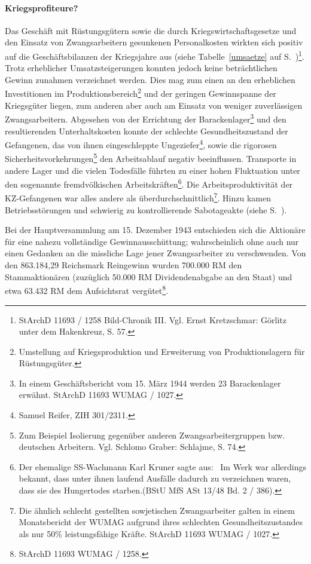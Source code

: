 \documentclass[a4paper,12pt,ngerman,
]{nisebook}
\begin{document}
\paragraph{Kriegsprofiteure?}
Das Geschäft mit Rüstungsgütern sowie die durch Kriegswirtschaftsgesetze und den Einsatz von Zwangsarbeitern gesunkenen Personalkosten wirkten sich positiv auf die Geschäftsbilanzen der Kriegsjahre aus (siehe Tabelle~\ref{umsaetze} auf S.~\pageref{umsaetze})\footnote{StArchD 11693 / 1258 Bild-Chronik III. Vgl. Ernst Kretzschmar: Görlitz unter dem Hakenkreuz, S. 57.}. Trotz erheblicher Umsatzsteigerungen konnten jedoch keine beträchtlichen Gewinn zunahmen verzeichnet werden. Dies mag zum einen an den erheblichen Investitionen im Produktionsbereich\footnote{Umstellung auf Kriegsproduktion und Erweiterung von Produktionslagern für Rüstungsgüter.} und der geringen Gewinnspanne der Kriegsgüter liegen, zum anderen aber auch am Einsatz von weniger zuverlässigen Zwangsarbeitern. Abgesehen von der Errichtung der Barackenlager\footnote{In einem Geschäftsbericht vom 15. März 1944 werden 23 Barackenlager erwähnt. StArchD 11693 WUMAG / 1027.} und den resultierenden Unterhaltskosten konnte der schlechte Gesundheitszustand der Gefangenen, das von ihnen eingeschleppte Ungeziefer\footnote{Samuel Reifer, ZIH 301/2311.}, sowie die rigorosen Sicherheitsvorkehrungen\footnote{Zum Beispiel Isolierung gegenüber anderen Zwangsarbeitergruppen bzw. deutschen Arbeitern. Vgl. Schlomo Graber: Schlajme, S. 74.} den Arbeitsablauf negativ beeinflussen. Transporte in andere Lager und die vielen Todesfälle führten zu einer hohen Fluktuation unter den sogenannte fremdvölkischen Arbeitskräften\footnote{Der ehemalige SS-Wachmann Karl Kruner sagte aus: \glqq~Im Werk war allerdings bekannt, dass unter ihnen laufend Ausfälle dadurch zu verzeichnen waren, dass sie des Hungertodes starben.\grqq (BStU MfS ASt 13/48 Bd. 2 / 386).}. Die Arbeitsproduktivität der KZ-Gefangenen war alles andere als überdurchschnittlich\footnote{Die ähnlich schlecht gestellten sowjetischen Zwangsarbeiter galten in einem Monatsbericht der WUMAG aufgrund ihres schlechten Gesundheitszustandes als nur 50\% leistungsfähige Kräfte. StArchD 11693 WUMAG / 1027.}. Hinzu kamen Betriebsstörungen und schwierig zu kontrollierende Sabotageakte (siehe S.~\pageref{loetzinn}).

Bei der Hauptversammlung am 15. Dezember 1943 entschieden sich die Aktionäre für eine nahezu vollständige Gewinnausschüttung; wahrscheinlich ohne auch nur einen Gedanken an die missliche Lage jener Zwangsarbeiter zu verschwenden. Von den 863.184,29 Reichsmark Reingewinn wurden 700.000 RM den Stammaktionären (zuzüglich 50.000 RM Dividendenabgabe an den Staat) und etwa 63.432 RM dem Aufsichtsrat vergütet\footnote{StArchD 11693 WUMAG / 1258.}.
\end{document}
